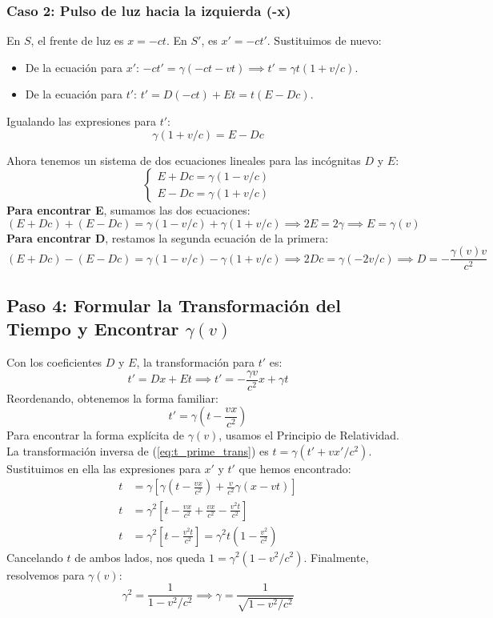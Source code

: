 \documentclass[11pt,a4paper]{article}
\begin{document}
\subsubsection*{Caso 2: Pulso de luz hacia la izquierda (-x)}
En $S$, el frente de luz es $x = -ct$. En $S'$, es $x' = -ct'$. Sustituimos de nuevo:
\begin{itemize}
    \item De la ecuación para $x'$: $-ct' = \gamma(-ct - vt) \implies t' = \gamma t (1 + v/c)$.
    \item De la ecuación para $t'$: $t' = D(-ct) + Et = t(E - Dc)$.
\end{itemize}
Igualando las expresiones para $t'$:
\begin{equation} \label{eq:sys2}
    \gamma (1 + v/c) = E - Dc
\end{equation}

Ahora tenemos un sistema de dos ecuaciones lineales para las incógnitas $D$ y $E$:
\[ \begin{cases} E + Dc = \gamma (1 - v/c) \\ E - Dc = \gamma (1 + v/c) \end{cases} \]
\textbf{Para encontrar E}, sumamos las dos ecuaciones:
\[ (E + Dc) + (E - Dc) = \gamma (1 - v/c) + \gamma (1 + v/c) \implies 2E = 2\gamma \implies \boxed{E = \gamma(v)} \]
\textbf{Para encontrar D}, restamos la segunda ecuación de la primera:
\[ (E + Dc) - (E - Dc) = \gamma (1 - v/c) - \gamma (1 + v/c) \implies 2Dc = \gamma(-2v/c) \implies \boxed{D = -\frac{\gamma(v) v}{c^2}} \]

\subsection*{Paso 4: Formular la Transformación del Tiempo y Encontrar \texorpdfstring{$\gamma(v)$}{gamma(v)}}
Con los coeficientes $D$ y $E$, la transformación para $t'$ es:
\[ t' = Dx + Et \implies t' = -\frac{\gamma v}{c^2}x + \gamma t \]
Reordenando, obtenemos la forma familiar:
\begin{equation} \label{eq:t_prime_trans}
    \boxed{t' = \gamma \left(t - \frac{vx}{c^2}\right)}
\end{equation}
Para encontrar la forma explícita de $\gamma(v)$, usamos el Principio de Relatividad. La transformación inversa de (\ref{eq:t_prime_trans}) es $t = \gamma(t' + vx'/c^2)$. Sustituimos en ella las expresiones para $x'$ y $t'$ que hemos encontrado:
\begin{align*}
    t &= \gamma \left[ \gamma \left(t - \frac{vx}{c^2}\right) + \frac{v}{c^2} \gamma(x - vt) \right] \\
    t &= \gamma^2 \left[ t - \frac{vx}{c^2} + \frac{vx}{c^2} - \frac{v^2t}{c^2} \right] \\
    t &= \gamma^2 \left[ t - \frac{v^2t}{c^2} \right] = \gamma^2 t \left(1 - \frac{v^2}{c^2}\right)
\end{align*}
Cancelando $t$ de ambos lados, nos queda $1 = \gamma^2 (1 - v^2/c^2)$. Finalmente, resolvemos para $\gamma(v)$:
\[ \gamma^2 = \frac{1}{1 - v^2/c^2} \implies \boxed{\gamma = \frac{1}{\sqrt{1 - v^2/c^2}}} \]
\end{document}
